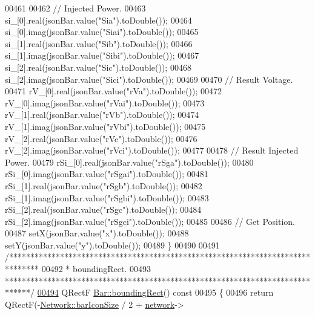 \begin{DoxyCode}
00461 
00462   \textcolor{comment}{// Injected Power.}
00463   si\_[0].real(jsonBar.value(\textcolor{stringliteral}{"Sia"}).toDouble());
00464   si\_[0].imag(jsonBar.value(\textcolor{stringliteral}{"Siai"}).toDouble());
00465   si\_[1].real(jsonBar.value(\textcolor{stringliteral}{"Sib"}).toDouble());
00466   si\_[1].imag(jsonBar.value(\textcolor{stringliteral}{"Sibi"}).toDouble());
00467   si\_[2].real(jsonBar.value(\textcolor{stringliteral}{"Sic"}).toDouble());
00468   si\_[2].imag(jsonBar.value(\textcolor{stringliteral}{"Sici"}).toDouble());
00469 
00470   \textcolor{comment}{// Result Voltage.}
00471   rV\_[0].real(jsonBar.value(\textcolor{stringliteral}{"rVa"}).toDouble());
00472   rV\_[0].imag(jsonBar.value(\textcolor{stringliteral}{"rVai"}).toDouble());
00473   rV\_[1].real(jsonBar.value(\textcolor{stringliteral}{"rVb"}).toDouble());
00474   rV\_[1].imag(jsonBar.value(\textcolor{stringliteral}{"rVbi"}).toDouble());
00475   rV\_[2].real(jsonBar.value(\textcolor{stringliteral}{"rVc"}).toDouble());
00476   rV\_[2].imag(jsonBar.value(\textcolor{stringliteral}{"rVci"}).toDouble());
00477 
00478   \textcolor{comment}{// Result Injected Power.}
00479   rSi\_[0].real(jsonBar.value(\textcolor{stringliteral}{"rSga"}).toDouble());
00480   rSi\_[0].imag(jsonBar.value(\textcolor{stringliteral}{"rSgai"}).toDouble());
00481   rSi\_[1].real(jsonBar.value(\textcolor{stringliteral}{"rSgb"}).toDouble());
00482   rSi\_[1].imag(jsonBar.value(\textcolor{stringliteral}{"rSgbi"}).toDouble());
00483   rSi\_[2].real(jsonBar.value(\textcolor{stringliteral}{"rSgc"}).toDouble());
00484   rSi\_[2].imag(jsonBar.value(\textcolor{stringliteral}{"rSgci"}).toDouble());
00485 
00486   \textcolor{comment}{// Get Position.}
00487   setX(jsonBar.value(\textcolor{stringliteral}{"x"}).toDouble());
00488   setY(jsonBar.value(\textcolor{stringliteral}{"y"}).toDouble());
00489 \}
00490 
00491 \textcolor{comment}{/*******************************************************************************}
00492 \textcolor{comment}{ * boundingRect.}
00493 \textcolor{comment}{ ******************************************************************************/}
\hypertarget{bar_8cpp_source_l00494}{}\hyperlink{group___models_ga8279d8109019cc7e139e2023690496be}{00494} QRectF \hyperlink{group___models_ga8279d8109019cc7e139e2023690496be}{Bar::boundingRect}()\textcolor{keyword}{ const}
00495 \textcolor{keyword}{}\{
00496   \textcolor{keywordflow}{return} QRectF(-\hyperlink{group___graphics_gaa334bbc93b3fde219840e95e23198b53}{Network::barIconSize} / 2 + \hyperlink{class_bar_a80025f13884750add58cc61b318357ff}{network}->

\end{DoxyCode}
